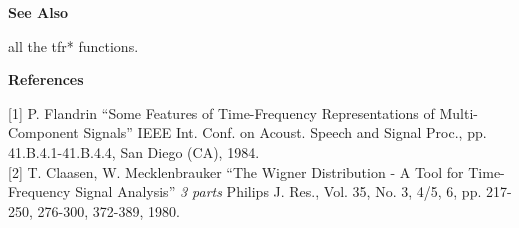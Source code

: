 {\bf \large \sf See Also}\\
\hspace*{1.5cm}
\begin{minipage}[t]{13.5cm}
all the {\ty tfr*} functions.
\end{minipage}
\vspace*{.5cm}

{\bf \large \sf References}\\
\hspace*{1.5cm}
\begin{minipage}[t]{13.5cm}
[1] P. Flandrin ``Some Features of Time-Frequency Representations of
Multi-Component Signals'' IEEE Int. Conf. on Acoust. Speech and Signal
Proc., pp. 41.B.4.1-41.B.4.4, San Diego (CA), 1984.\\

[2] T. Claasen, W. Mecklenbrauker ``The Wigner Distribution - A Tool for
Time-Frequency Signal Analysis'' {\it 3 parts} Philips
J. Res., Vol. 35, No. 3, 4/5, 6, pp. 217-250, 276-300, 372-389, 1980.
\end{minipage}



